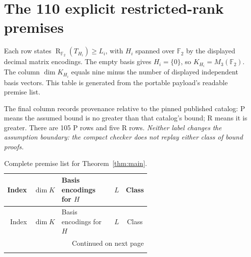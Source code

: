 \documentclass[11pt]{article}
\newcommand{\F}{\mathbb F_2}
\newcommand{\V}{M_3(\F)}
\newcommand{\R}{\operatorname{R}_{\F}}
\theoremstyle{definition}
\begin{document}



\appendix
\section{The 110 explicit restricted-rank premises}\label{app:premises}
Each row states $\R(T_{H_i})\geq L_i$, with $H_i$ spanned over $\F$ by the displayed decimal matrix encodings. The empty basis gives $H_i=\{0\}$, so $K_{H_i}=\V$. The column $\dim K_{H_i}$ equals nine minus the number of displayed independent basis vectors. This table is generated from the portable payload's readable premise list.

The final column records provenance relative to the pinned published catalog: P means the assumed bound is no greater than that catalog's bound; R means it is greater. There are 105 P rows and five R rows. \emph{Neither label changes the assumption boundary: the compact checker does not replay either class of bound proofs.}

{\small
\setlength{\tabcolsep}{5pt}
\begin{longtable}{rrp{0.58\linewidth}rc}
\caption{Complete premise list for Theorem~\ref{thm:main}.}\label{tab:premises}\\
\toprule
Index & $\dim K$ & Basis encodings for $H$ & $L$ & Class \\
\midrule
\endfirsthead
\toprule
Index & $\dim K$ & Basis encodings for $H$ & $L$ & Class \\
\midrule
\endhead
\midrule\multicolumn{5}{r}{Continued on next page}\\\endfoot
\bottomrule\endlastfoot

\end{longtable}
}
\end{document}
